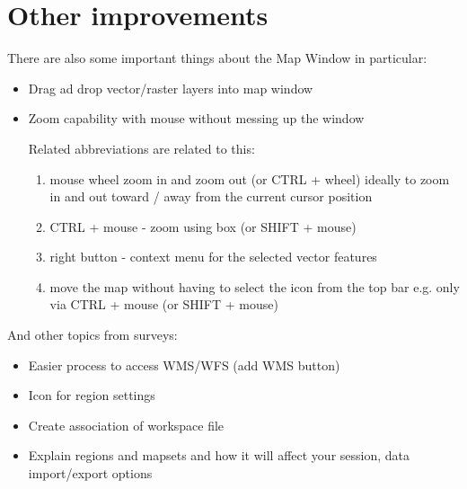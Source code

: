\documentclass[a4paper,10pt,twoside]{article}
\begin{document}
\newpage
\section{Other improvements}

There are also some important things about the Map Window in particular:

\begin{itemize}
\item	Drag ad drop vector/raster layers into map window
\end{itemize}

\begin{itemize}
\item	Zoom capability with mouse without messing up the window

Related abbreviations are related to this:
\begin{enumerate}
\item mouse wheel zoom in and zoom out (or CTRL + wheel) ideally to zoom in and out toward / away from the current cursor position

\item CTRL + mouse - zoom using box (or SHIFT + mouse)
\item right button - context menu for the selected vector features
\item move the map without having to select the icon from the top bar
e.g. only via CTRL + mouse (or SHIFT + mouse)

\end{enumerate}
\end{itemize}

And other topics from surveys:

\begin{itemize}
\item Easier process to access WMS/WFS (add WMS button)
\end{itemize}

\begin{itemize}
\item Icon for region settings
\end{itemize}

\begin{itemize}
\item Create association of workspace file
\end{itemize}

\begin{itemize}
\item Explain regions and mapsets and how it will affect your session, data import/export options
\end{itemize}
\end{document}
